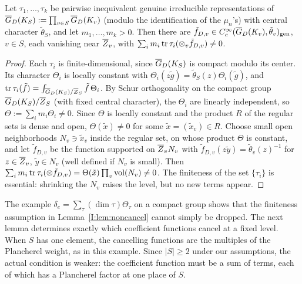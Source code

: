 \begin{lemma}\label{I:lem:noncancel}
Let $\tau_1,\dots,\tau_k$ be pairwise inequivalent genuine irreducible representations of $\overline{G}_D(K_S):=\prod_{v\in S}\overline{G}_D(K_v)$ (modulo the identification of the $\mu_n$'s) with central character $\tilde\theta_S$, and let $m_1,\dots,m_k>0$. Then there are $\tilde f_{D,v}\in C_c^\infty(\overline{G}_D(K_v),\tilde\theta_v)_{\mathrm{gen}}$, $v\in S$, each vanishing near $\overline{Z}_v$, with $\sum_im_i\operatorname{tr}\tau_i(\otimes_v\tilde f_{D,v})\ne0$.
\end{lemma}
\begin{proof}
Each $\tau_i$ is finite-dimensional, since $\overline{G}_D(K_S)$ is compact modulo its center. Its character $\Theta_i$ is locally constant with $\Theta_i(z\tilde g)=\tilde\theta_S(z)\Theta_i(\tilde g)$, and $\operatorname{tr}\tau_i(\tilde f)=\int_{\overline{G}_D(K_S)/\overline{Z}_S}\tilde f\,\Theta_i$. By Schur orthogonality on the compact group $\overline{G}_D(K_S)/\overline{Z}_S$ (with fixed central character), the $\Theta_i$ are linearly independent, so $\Theta:=\sum_im_i\Theta_i\ne0$. Since $\Theta$ is locally constant and the product $R$ of the regular sets is dense and open, $\Theta(\tilde x)\ne0$ for some $\tilde x=(\tilde x_v)\in R$. Choose small open neighborhoods $N_v\ni\tilde x_v$ inside the regular set, on whose product $\Theta$ is constant, and let $\tilde f_{D,v}$ be the function supported on $\overline{Z}_vN_v$ with $\tilde f_{D,v}(z\tilde y)=\tilde\theta_v(z)^{-1}$ for $z\in\overline{Z}_v$, $\tilde y\in N_v$ (well defined if $N_v$ is small). Then $\sum_im_i\operatorname{tr}\tau_i(\otimes\tilde f_{D,v})=\Theta(\tilde x)\prod_v\operatorname{vol}(N_v)\ne0$. The finiteness of the set $\{\tau_i\}$ is essential: shrinking the $N_v$ raises the level, but no new terms appear.
\end{proof}

The example $\delta_e=\sum_\tau(\dim\tau)\Theta_\tau$ on a compact group shows that the finiteness assumption in Lemma~\ref{I:lem:noncancel} cannot simply be dropped. The next lemma determines exactly which coefficient functions cancel at a fixed level. When $S$ has one element, the cancelling functions are the multiples of the Plancherel weight, as in this example. Since $|S|\ge2$ under our assumptions, the actual condition is weaker: the coefficient function must be a sum of terms, each of which has a Plancherel factor at one place of $S$.

